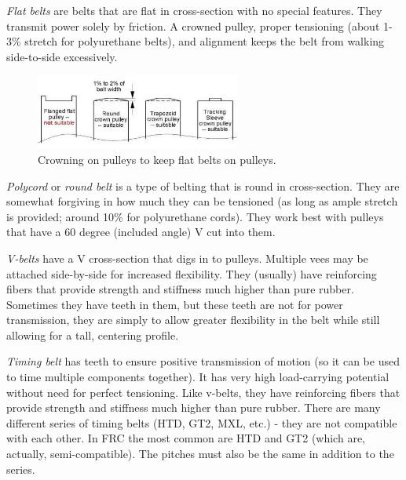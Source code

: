 \documentclass[10pt,letterpaper]{book}
\begin{document}
\begin{asparaenum}[a)]
	\item \textit{Flat belts} are belts that are flat in cross-section with no special features. They transmit power solely by friction. A crowned pulley, proper tensioning (about 1-3\% stretch for polyurethane belts), and alignment keeps the belt from walking side-to-side excessively.
	\begin{figure}[H]
		\includegraphics[width=0.6\textwidth]{imgs/belt_crown_pulley.jpeg}
		\caption{Crowning on pulleys to keep flat belts on pulleys.}
	\end{figure}
	\item \textit{Polycord} or \textit{round belt} is a type of belting that is round in cross-section. They are somewhat forgiving in how much they can be tensioned (as long as ample stretch is provided; around 10\% for polyurethane cords). They work best with pulleys that have a 60 degree (included angle) V cut into them.
	\item \textit{V-belts} have a V cross-section that digs in to pulleys. Multiple vees may be attached side-by-side for increased flexibility. They (usually) have reinforcing fibers that provide strength and stiffness much higher than pure rubber. Sometimes they have teeth in them, but these teeth are not for power transmission, they are simply to allow greater flexibility in the belt while still allowing for a tall, centering profile.
	\item \textit{Timing belt} has teeth to ensure positive transmission of motion (so it can be used to time multiple components together). It has very high load-carrying potential without need for perfect tensioning. Like v-belts, they have reinforcing fibers that provide strength and stiffness much higher than pure rubber. There are many different series of timing belts (HTD, GT2, MXL, etc.) - they are not compatible with each other. In FRC the most common are HTD and GT2 (which are, actually, semi-compatible). The pitches must also be the same in addition to the series.
\end{asparaenum}
\end{document}

